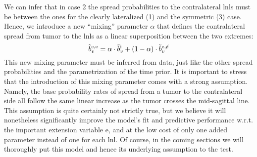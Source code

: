 \documentclass[\relativeRoot/main.tex]{subfiles}
\begin{document}
We can infer that in case 2 the spread probabilities to the contralateral \glspl{lnl} must be between the ones for the clearly lateralized (1) and the symmetric (3) case. Hence, we introduce a new ``mixing'' parameter $\alpha$ that defines the contralateral spread from tumor to the \glspl{lnl} as a linear superposition between the two extremes:
%
\begin{equation}
    \Tilde{b}_v^{\text{c} , \text{e}} = \alpha \cdot \Tilde{b}_v^\text{i} + (1 - \alpha) \cdot \Tilde{b}_v^{\text{c} , \centernot{\text{e}}}
\end{equation}
%
This new mixing parameter must be inferred from data, just like the other spread probabilities and the parametrization of the time prior. It is important to stress that the introduction of this mixing parameter comes with a strong assumption. Namely, the base probability rates of spread from a tumor to the contralateral side all follow the same linear increase as the tumor crosses the mid-sagittal line. This assumption is quite certainly not strictly true, but we believe it will nonetheless significantly improve the model's fit and predictive performance w.r.t. the important extension variable $\text{e}$, and at the low cost of only one added parameter instead of one for each \gls{lnl}. Of course, in the coming sections we will thoroughly put this model and hence its underlying assumption to the test.
\end{document}
